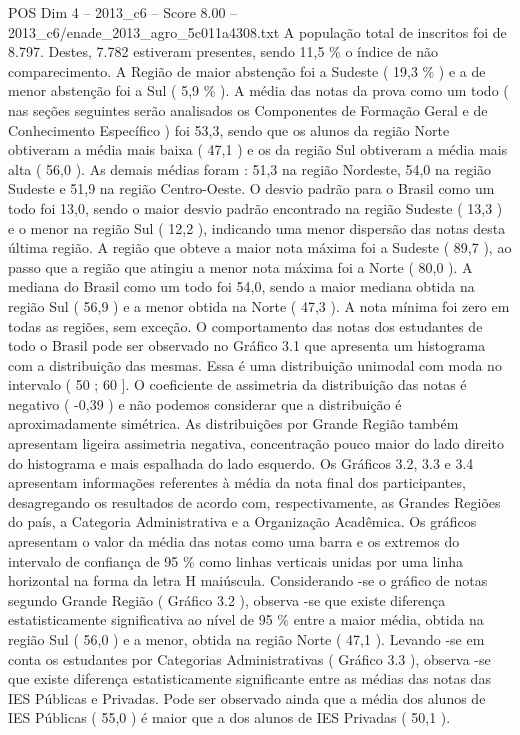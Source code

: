 \begin{textsample}{POS Dim 4 – 2013\_c6 – Score 8.00 – 2013\_c6/enade\_2013\_agro\_5c011a4308.txt}
A população total de inscritos foi de 8.797.
Destes, 7.782 estiveram presentes, sendo 11,5 \% o índice de não comparecimento.
A Região de maior abstenção foi a Sudeste ( 19,3 \% ) e a de menor abstenção foi a Sul ( 5,9 \% ).
A média das notas da prova como um todo ( nas seções seguintes serão analisados os Componentes de Formação Geral e de Conhecimento Específico ) foi 53,3, sendo que os alunos da região Norte obtiveram a média mais baixa ( 47,1 ) e os da região Sul obtiveram a média mais alta ( 56,0 ).
As demais médias foram : 51,3 na região Nordeste, 54,0 na região Sudeste e 51,9 na região Centro-Oeste.
O desvio padrão para o Brasil como um todo foi 13,0, sendo o maior desvio padrão encontrado na região Sudeste ( 13,3 ) e o menor na região Sul ( 12,2 ), indicando uma menor dispersão das notas desta última região.
A região que obteve a maior nota máxima foi a Sudeste ( 89,7 ), ao passo que a região que atingiu a menor nota máxima foi a Norte ( 80,0 ).
A mediana do Brasil como um todo foi 54,0, sendo a maior mediana obtida na região Sul ( 56,9 ) e a menor obtida na Norte ( 47,3 ).
A nota mínima foi zero em todas as regiões, sem exceção.
O comportamento das notas dos estudantes de todo o Brasil pode ser observado no Gráfico 3.1 que apresenta um histograma com a distribuição das mesmas.
Essa é uma distribuição unimodal com moda no intervalo ( 50 ; 60 ].
O coeficiente de assimetria da distribuição das notas é negativo ( -0,39 ) e não podemos considerar que a distribuição é aproximadamente simétrica.
As distribuições por Grande Região também apresentam ligeira assimetria negativa, concentração pouco maior do lado direito do histograma e mais espalhada do lado esquerdo.
Os Gráficos 3.2, 3.3 e 3.4 apresentam informações referentes à média da nota final dos participantes, desagregando os resultados de acordo com, respectivamente, as Grandes Regiões do país, a Categoria Administrativa e a Organização Acadêmica.
Os gráficos apresentam o valor da média das notas como uma barra e os extremos do intervalo de confiança de 95 \% como linhas verticais unidas por uma linha horizontal na forma da letra H maiúscula.
Considerando -se o gráfico de notas segundo Grande Região ( Gráfico 3.2 ), observa -se que existe diferença estatisticamente significativa ao nível de 95 \% entre a maior média, obtida na região Sul ( 56,0 ) e a menor, obtida na região Norte ( 47,1 ).
Levando -se em conta os estudantes por Categorias Administrativas ( Gráfico 3.3 ), observa -se que existe diferença estatisticamente significante entre as médias das notas das IES Públicas e Privadas.
Pode ser observado ainda que a média dos alunos de IES Públicas ( 55,0 ) é maior que a dos alunos de IES Privadas ( 50,1 ).

\end{textsample}
